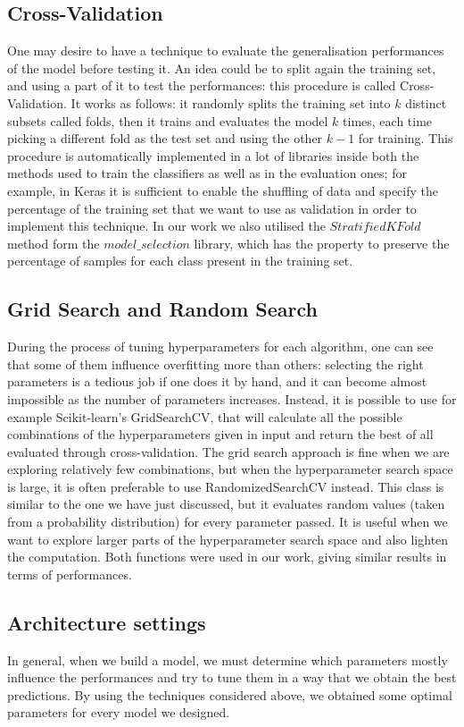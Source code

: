 \documentclass[12pt]{article}
\begin{document}
\subsection{Cross-Validation}
One may desire to have a technique to evaluate the generalisation performances of the model before testing it. An idea could be to split again the training set, and using a part of it to test the performances: this procedure is called Cross-Validation.
It works as follows: it randomly splits the training set into $k$ distinct subsets called folds, then it trains and evaluates the model $k$ times, each time picking a different fold as the test set and using the other $k-1$ for training.
This procedure is automatically implemented in a lot of libraries inside both the methods used to train the classifiers as well as in the evaluation ones; for example, in Keras it is sufficient to enable the shuffling of data and specify the percentage of the training set that we want to use as validation in order to implement this technique. In our work we also utilised the $StratifiedKFold$ method form the $model\_selection$ library, which has the property to preserve the percentage of samples for each class present in the training set.

\subsection{Grid Search and Random Search}
During the process of tuning hyperparameters for each algorithm, one can see that some of them influence overfitting more than others: selecting the right parameters is a tedious job if one does it by hand, and it can become almost impossible as the number of parameters increases.
Instead, it is possible to use for example Scikit-learn's GridSearchCV, that will calculate all the possible combinations of the hyperparameters given in input and return the best of all evaluated through cross-validation. 
The grid search approach is fine when we are exploring relatively few combinations, but when the hyperparameter search space is large, it is often preferable to use RandomizedSearchCV instead. This class is similar to the one we have just discussed, but it evaluates random values (taken from a probability distribution) for every parameter passed.
It is useful when we want to explore larger parts of the hyperparameter search space and also lighten the computation.
Both functions were used in our work, giving similar results in terms of performances.


\subsection{Architecture settings}
In general, when we build a model, we must determine which parameters mostly influence the performances and try to tune them in a way that we obtain the best predictions. By using the techniques considered above, we obtained some optimal parameters for every model we designed. 
\end{document}
